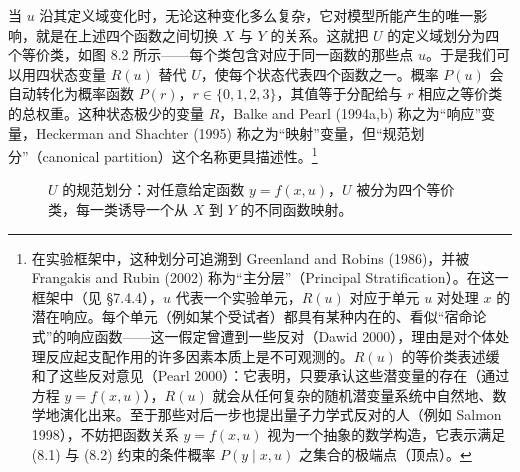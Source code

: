 当 $u$ 沿其定义域变化时，无论这种变化多么复杂，它对模型所能产生的唯一影响，就是在上述四个函数之间切换 $X$ 与 $Y$ 的关系。这就把 $U$ 的定义域划分为四个等价类，如图 8.2 所示——每个类包含对应于同一函数的那些点 $u$。于是我们可以用四状态变量 $R(u)$ 替代 $U$，使每个状态代表四个函数之一。概率 $P(u)$ 会自动转化为概率函数 $P(r)$，$r\in\{0,1,2,3\}$，其值等于分配给与 $r$ 相应之等价类的总权重。这种状态极少的变量 $R$，Balke and Pearl (1994a,b) 称之为“响应”变量，Heckerman and Shachter (1995) 称之为“映射”变量，但“规范划分”（canonical partition）这个名称更具描述性。\footnote{在实验框架中，这种划分可追溯到 Greenland and Robins (1986)，并被 Frangakis and Rubin (2002) 称为“主分层”（Principal Stratification）。在这一框架中（见 \S 7.4.4），$u$ 代表一个实验单元，$R(u)$ 对应于单元 $u$ 对处理 $x$ 的潜在响应。每个单元（例如某个受试者）都具有某种内在的、看似“宿命论式”的响应函数——这一假定曾遭到一些反对（Dawid 2000），理由是对个体处理反应起支配作用的许多因素本质上是不可观测的。$R(u)$ 的等价类表述缓和了这些反对意见（Pearl 2000）：它表明，只要承认这些潜变量的存在（通过方程 $y=f(x,u)$），$R(u)$ 就会从任何复杂的随机潜变量系统中自然地、数学地演化出来。至于那些对后一步也提出量子力学式反对的人（例如 Salmon 1998），不妨把函数关系 $y=f(x,u)$ 视为一个抽象的数学构造，它表示满足 \textup{(8.1)} 与 \textup{(8.2)} 约束的条件概率 $P(y\mid x,u)$ 之集合的极端点（顶点）。}

\begin{figure}[htbp]
\centering
{}
\caption{$U$ 的规范划分：对任意给定函数 $y=f(x,u)$，$U$ 被分为四个等价类，每一类诱导一个从 $X$ 到 $Y$ 的不同函数映射。}
\label{fig:8.2}
\end{figure}

